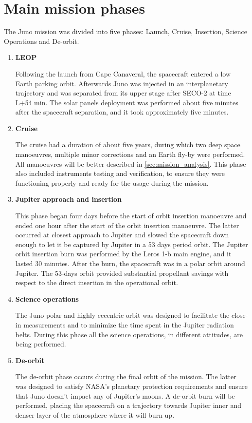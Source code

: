 \section{Main mission phases}
\label{sec:phases}

The Juno mission was divided into five phases: Launch, Cruise, Insertion, Science Operations and De-orbit.
\begin{enumerate}
    \item \textbf{LEOP}
    
    Following the launch from Cape Canaveral, the spacecraft entered a low Earth parking orbit.
     Afterwards Juno was injected in an interplanetary trajectory and was separated from its upper stage after SECO-2 at time L+54 min.
    The solar panels deployment was performed about five minutes after the spacecraft separation, and it took approximately five minutes.

    \item \textbf{Cruise}
    
    The cruise had a duration of about five years, during which two deep space manoeuvres, multiple minor corrections and an Earth fly-by were performed.
    All manoeuvres will be better described in \autoref{sec:mission_analysis}. This phase also included instruments testing and verification, to ensure they were functioning properly and ready for the usage during the mission. 

    \item \textbf{Jupiter approach and insertion}
    
    This phase began four days before the start of orbit insertion manoeuvre and ended one hour after the start of the orbit insertion manoeuvre. The latter occurred at closest approach to Jupiter and slowed the spacecraft down enough to let it be captured by Jupiter in a 53 days period orbit.
    The Jupiter orbit insertion burn was performed by the Leros 1-b main engine, and it lasted 30 minutes. After the burn, the spacecraft was in a polar orbit around Jupiter.
    The 53-days orbit provided substantial propellant savings with respect to the direct insertion in the operational orbit.

    \item \textbf{Science operations}
    
    The Juno polar and highly eccentric orbit was designed to facilitate the close-in measurements and to minimize the time spent in the Jupiter radiation belts. During this phase all the science operations, in different attitudes, are being performed.

    \item \textbf{De-orbit}
    
    The de-orbit phase occurs during the final orbit of the mission. The latter was designed to satisfy NASA's planetary protection requirements and ensure that Juno doesn't impact any of Jupiter's moons. A de-orbit burn will be performed, placing the spacecraft on a trajectory towards Jupiter inner and denser layer of the atmosphere where it will burn up.   
     
\end{enumerate}